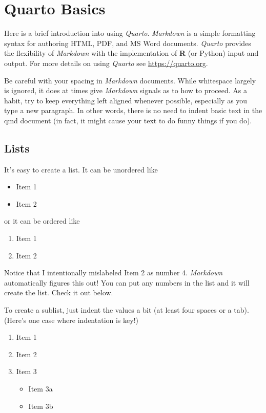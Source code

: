 \documentclass[
  letterpaper,
  12pt,
  twoside]{reedthesis}
\providecommand{\tightlist}{%
  \setlength{\itemsep}{0pt}\setlength{\parskip}{0pt}}
\begin{document}

\chapter{Quarto Basics}\label{rmd-basics}

Here is a brief introduction into using \emph{Quarto}. \emph{Markdown}
is a simple formatting syntax for authoring HTML, PDF, and MS Word
documents. \emph{Quarto} provides the flexibility of \emph{Markdown}
with the implementation of \textbf{R} (or Python) input and output. For
more details on using \emph{Quarto} see \url{https://quarto.org}.

Be careful with your spacing in \emph{Markdown} documents. While
whitespace largely is ignored, it does at times give \emph{Markdown}
signals as to how to proceed. As a habit, try to keep everything left
aligned whenever possible, especially as you type a new paragraph. In
other words, there is no need to indent basic text in the qmd document
(in fact, it might cause your text to do funny things if you do).

\section{Lists}\label{lists}

It's easy to create a list. It can be unordered like

\begin{itemize}
\tightlist
\item
  Item 1
\item
  Item 2
\end{itemize}

or it can be ordered like

\begin{enumerate}
\def\labelenumi{\arabic{enumi}.}
\tightlist
\item
  Item 1
\item
  Item 2
\end{enumerate}

Notice that I intentionally mislabeled Item 2 as number 4.
\emph{Markdown} automatically figures this out! You can put any numbers
in the list and it will create the list. Check it out below.

To create a sublist, just indent the values a bit (at least four spaces
or a tab). (Here's one case where indentation is key!)

\begin{enumerate}
\def\labelenumi{\arabic{enumi}.}
\tightlist
\item
  Item 1
\item
  Item 2
\item
  Item 3

  \begin{itemize}
  \tightlist
  \item
    Item 3a
  \item
    Item 3b
  \end{itemize}
\end{enumerate}
\end{document}
